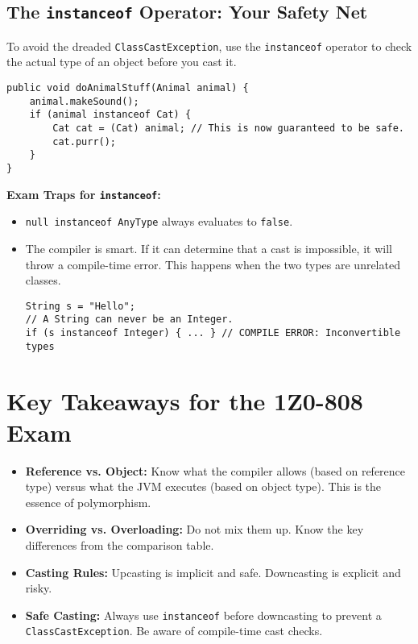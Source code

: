 \documentclass[12pt]{article}
\begin{document}
\begin{enumerate}[label=(\arabic*)]
\subsection{The \texttt{instanceof} Operator: Your Safety Net}
To avoid the dreaded \texttt{ClassCastException}, use the \texttt{instanceof} operator to check the actual type of an object before you cast it.
\begin{verbatim}
public void doAnimalStuff(Animal animal) {
    animal.makeSound();
    if (animal instanceof Cat) {
        Cat cat = (Cat) animal; // This is now guaranteed to be safe.
        cat.purr();
    }
}
\end{verbatim}
\textbf{Exam Traps for \texttt{instanceof}:}
\begin{itemize}
    \item \texttt{null instanceof AnyType} always evaluates to \texttt{false}.
    \item The compiler is smart. If it can determine that a cast is impossible, it will throw a compile-time error. This happens when the two types are unrelated classes.
\begin{verbatim}
String s = "Hello";
// A String can never be an Integer.
if (s instanceof Integer) { ... } // COMPILE ERROR: Inconvertible types
\end{verbatim}
\end{itemize}

\section*{Key Takeaways for the 1Z0-808 Exam}
\begin{itemize}
    \item \textbf{Reference vs. Object:} Know what the compiler allows (based on reference type) versus what the JVM executes (based on object type). This is the essence of polymorphism.
    \item \textbf{Overriding vs. Overloading:} Do not mix them up. Know the key differences from the comparison table.
    \item \textbf{Casting Rules:} Upcasting is implicit and safe. Downcasting is explicit and risky.
    \item \textbf{Safe Casting:} Always use \texttt{instanceof} before downcasting to prevent a \texttt{ClassCastException}. Be aware of compile-time cast checks.
\end{itemize}
\end{enumerate}
\end{document}
